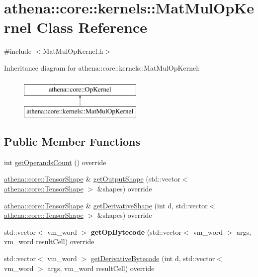 \hypertarget{classathena_1_1core_1_1kernels_1_1_mat_mul_op_kernel}{}\section{athena\+:\+:core\+:\+:kernels\+:\+:Mat\+Mul\+Op\+Kernel Class Reference}
\label{classathena_1_1core_1_1kernels_1_1_mat_mul_op_kernel}


{\ttfamily \#include $<$Mat\+Mul\+Op\+Kernel.\+h$>$}

Inheritance diagram for athena\+:\+:core\+:\+:kernels\+:\+:Mat\+Mul\+Op\+Kernel\+:\begin{figure}[H]
\begin{center}
\leavevmode
\includegraphics[height=2.000000cm]{db/dc5/classathena_1_1core_1_1kernels_1_1_mat_mul_op_kernel}
\end{center}
\end{figure}
\subsection*{Public Member Functions}
\begin{DoxyCompactItemize}
\item 
int \mbox{\hyperlink{classathena_1_1core_1_1kernels_1_1_mat_mul_op_kernel_a75f9e43d1fcecaf9260af31c68cd69db}{get\+Operands\+Count}} () override
\item 
\mbox{\hyperlink{classathena_1_1core_1_1_tensor_shape}{athena\+::core\+::\+Tensor\+Shape}} \& \mbox{\hyperlink{classathena_1_1core_1_1kernels_1_1_mat_mul_op_kernel_a3a397257c208f55ba5fba4018112a605}{get\+Output\+Shape}} (std\+::vector$<$ \mbox{\hyperlink{classathena_1_1core_1_1_tensor_shape}{athena\+::core\+::\+Tensor\+Shape}} $>$ \&shapes) override
\item 
\mbox{\hyperlink{classathena_1_1core_1_1_tensor_shape}{athena\+::core\+::\+Tensor\+Shape}} \& \mbox{\hyperlink{classathena_1_1core_1_1kernels_1_1_mat_mul_op_kernel_abdb57e6ce0d67ce6263e0716fed25243}{get\+Derivative\+Shape}} (int d, std\+::vector$<$ \mbox{\hyperlink{classathena_1_1core_1_1_tensor_shape}{athena\+::core\+::\+Tensor\+Shape}} $>$ \&shapes) override
\item 
\mbox{\label{classathena_1_1core_1_1kernels_1_1_mat_mul_op_kernel_ac6dc778bb5313e5c567410fd5f217351}} 
std\+::vector$<$ vm\+\_\+word $>$ {\bfseries get\+Op\+Bytecode} (std\+::vector$<$ vm\+\_\+word $>$ args, vm\+\_\+word result\+Cell) override
\item 
std\+::vector$<$ vm\+\_\+word $>$ \mbox{\hyperlink{classathena_1_1core_1_1kernels_1_1_mat_mul_op_kernel_a42d08b8004e8033e01988eb2392215c8}{get\+Derivative\+Bytecode}} (int d, std\+::vector$<$ vm\+\_\+word $>$ args, vm\+\_\+word result\+Cell) override
\end{DoxyCompactItemize}
